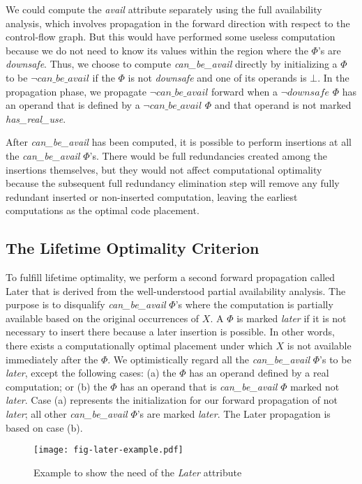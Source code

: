 We could compute the \emph{avail} attribute separately using the full
availability analysis, which involves propagation in the forward direction
with respect to the control-flow graph.  But this would have performed some
useless computation because we do not need to know its values within the region 
where the $\Phi$'s are \emph{downsafe}.  Thus, we choose to compute
\emph{can\_be\_avail} directly by initializing a $\Phi$ to be 
$\neg can\_be\_avail$ if
the $\Phi$ is not \emph{downsafe} and one of its operands is $\bot$.
In the propagation phase, we propagate $\neg can\_be\_avail$ forward when
a $\neg downsafe$  $\Phi$ has an operand that is defined by a 
$\neg can\_be\_avail$ $\Phi$ and that operand is not marked \emph{has\_real\_use}.

After \emph{can\_be\_avail} has been computed, it is possible to perform 
insertions at
all the \emph{can\_be\_avail} $\Phi$'s.  There would be full redundancies
created among the insertions themselves, but they would not affect 
computational optimality because the subsequent full redundancy elimination 
step will remove any fully redundant inserted or non-inserted computation, 
leaving the earliest computations as the optimal code placement.

\subsection{The Lifetime Optimality Criterion}

To fulfill lifetime optimality, we perform a second forward propagation called
Later that is derived from the well-understood partial availability 
analysis.  The purpose is to disqualify \emph{can\_be\_avail} $\Phi$'s where
the computation is
partially available based on the original occurrences of $X$.
A $\Phi$ is marked \emph{later} if it is not necessary to insert there because
a later insertion is possible.  In other words, there exists a computationally
optimal placement under which $X$ is not available immediately after the $\Phi$.
We optimistically regard all the
\emph{can\_be\_avail} $\Phi$'s to be \emph{later}, except the following cases:
(a) the $\Phi$ has an operand defined by a real computation; or (b) the $\Phi$
has an operand that is \emph{can\_be\_avail} $\Phi$ marked not \emph{later}.  Case (a) represents
the initialization for our forward propagation of not \emph{later}; all other
\emph{can\_be\_avail} $\Phi$'s are marked \emph{later}.  The Later
propagation is based on case (b).

\begin{figure}
\centering
\texttt{[image: fig-later-example.pdf]}
\caption{Example to show the need of the \emph{Later} attribute}
\label{fig: later-example}
\end{figure}

